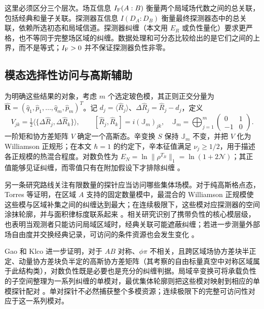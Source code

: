 \documentclass[UTF8,11pt,a4paper,fontset=none]{ctexart}
\begin{document}
\label{subsec:three-correlation-levels}

这里必须区分三个层次。场互信息 $I_{\rm F}(A:B)$ 衡量两个局域场代数之间的总关联，包括经典和量子关联。探测器互信息 $I(D_A:D_B)$ 衡量最终探测器态中的总关联，依赖所选初态和局域信道。探测器纠缠（本文用 $E_R$ 或负性量化）要求更严格，也不等同于完整场区域的纠缠。数据处理和可分态比较给出的是它们之间的上界，而不是等式；$I_{\rm F}>0$ 并不保证探测器负性非零。


\subsection{模态选择性访问与高斯辅助}\label{subsec:gaussian-mode-access}

为明确这些结果的对象，考虑 $m$ 个选定玻色模，其正则正交分量为 $\hat{\boldsymbol R}=(\hat q_1,\hat p_1,\ldots,\hat q_m,\hat p_m)^T$。记 $d_j=\langle\hat R_j\rangle$、$\Delta\hat R_j=\hat R_j-d_j$，定义
\begin{equation}
V_{jk}=\tfrac12\langle\{\Delta\hat R_j,\Delta\hat R_k\}\rangle,
\qquad [\hat R_j,\hat R_k]=i(\mathbb J_m)_{jk},
\quad \mathbb J_m=\bigoplus_{j=1}^{m}\begin{pmatrix}0&1\\-1&0\end{pmatrix}.
\label{eq:gaussian-covariance}
\end{equation}
一阶矩和协方差矩阵 $V$ 确定一个高斯态。辛变换 $S$ 保持 $\mathbb J_m$ 不变，并把 $V$ 化为 Williamson 正规形；在本文 $\hbar=1$ 的约定下，辛本征值满足 $\nu_j\geq1/2$，用于描述各正规模的热混合程度。对数负性为 $E_N=\ln\|\rho^{T_B}\|_1=\ln(1+2\mathcal N)$；其正值能够见证纠缠，而零值只有在附加假设下才排除纠缠 \cite{Weedbrook2012}。

另一条研究路线关注有限数量的探针应当访问哪些集体场模。对于纯高斯格点态，Torres 等证明，在区域 $A$ 支持的固定数量模中，最混合的 Williamson 正规模使这些模与区域补集之间的纠缠达到最大；在连续极限下，这些模对应探测器的空间涂抹轮廓，并与面积律标度联系起来 \cite{Torres2023}。相关研究识别了携带负性的核心模层级，也表明当观测者只能访问局域区域时，经典关联可能遮蔽纠缠；若进一步测量外部场自由度并交换经典记录，可访问的条件资源也会发生变化 \cite{KlcoBeckSavage2023,KlcoBeck2023}。

Gao 和 Klco 进一步证明，对于 $AB$ 对称、$\phi\pi$ 不相关，且跨区域场协方差块半正定、动量协方差块负半定的高斯协方差矩阵（其考察的自由标量真空中对称区域属于此结构类），对数负性既是必要也是充分的纠缠判据。局域辛变换可将承载负性的子空间整理为一系列纠缠的单模对，最优集体轮廓则把这些模对映射到相应的单模探针配对 \cite{GaoKlco2025}。单对探针不必然捕获整个多模资源；连续极限下的完整可访问性对应于这一系列模对。
\end{document}
